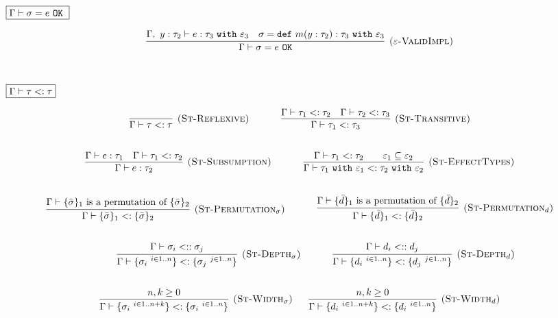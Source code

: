 \documentclass{llncs}
\newcommand{\keywadj}[1]{\mathtt{#1}}
\newcommand{\keyw}[1]{\keywadj{#1}~}
\newcommand{\type}[2]{
	#1~\keyw{with} #2
}
\begin{document}
\noindent
$\fbox{$\Gamma \vdash \sigma = e~\keyw{OK}$}$

\[
\begin{array}{c}
\infer[\textsc{($\varepsilon$-ValidImpl)}]
	{\Gamma \vdash \sigma = e~\keywadj{OK}}
	{\Gamma,~y:\tau_{2} \vdash e: \tau_{3}~\keyw{with} \varepsilon_3 & \sigma = \keyw{def} m(y:\tau_{2}):\tau_{3}~\keyw{with} \varepsilon_3} \\[5ex]
\end{array}
\]



\noindent
$\fbox{$\Gamma \vdash \tau <: \tau$}$

\[
\begin{array}{c}

\infer[\textsc{(St-Reflexive)}]
	{\Gamma \vdash \tau <: \tau}
	{}
	
~~~~~~~~~~

	\infer[\textsc{(St-Transitive)}]
	{\Gamma \vdash \tau_1 <: \tau_3}
	{\Gamma \vdash \tau_1 <: \tau_2 & \Gamma \vdash \tau_2 <: \tau_3}\\[5ex]

\infer[\textsc{(St-Subsumption)}]
	{\Gamma \vdash e : \tau_2}
	{\Gamma \vdash e : \tau_1 & \Gamma \vdash \tau_1 <: \tau_2} 
	
	~~~~~~~~~~
	
\infer[\textsc{(St-EffectTypes)}]
	{ \Gamma \vdash \type{\tau_1}{\varepsilon_1} <: \type{\tau_2}{\varepsilon_2}}
	{ \Gamma \vdash \tau_1 <: \tau_2 ~~~~~~ \varepsilon_1 \subseteq \varepsilon_2} \\[5ex]

\infer[\textsc{(St-Permutation$_\sigma$)}]
	{\Gamma \vdash \{ \bar \sigma \}_1 <: \{ \bar \sigma \}_2 }
	{\Gamma \vdash \{ \bar \sigma \}_1 $ is a permutation of $ \{ \bar \sigma \}_2}
	
	~~~~~~~~~~
	
\infer[\textsc{(St-Permutation$_d$)}]
	{\Gamma \vdash \{ \bar d \}_1 <: \{ \bar d \}_2 }
	{\Gamma \vdash \{ \bar d \}_1 $ is a permutation of $ \{ \bar d \}_2}
	
	\\[5ex]
	
	~~~~~~~~~~

\infer[\textsc{(St-Depth$_\sigma$)}]
	{ \Gamma \vdash \{ \sigma_i~^{i \in 1..n} \} <: \{ \sigma_j~^{j \in 1..n} \} }
	{ \Gamma \vdash \sigma_i <:: \sigma_j }
	
	~~~~~~~~~~
	
\infer[\textsc{(St-Depth$_d$)}]
	{ \Gamma \vdash \{ d_i~^{i \in 1..n} \} <: \{ d_j~^{j \in 1..n} \} }
	{ \Gamma \vdash d_i <:: d_j }
	
	\\[5ex]
	
\infer[\textsc{(St-Width$_\sigma$)}]
	{ \Gamma \vdash \{ \sigma_i~^{i \in 1..n+k} \} <: \{ \sigma_i~^{i \in 1..n} \} }
	{n,k \geq 0}
	
~~~~~
  
\infer[\textsc{(St-Width$_d$)}]
	{ \Gamma \vdash \{ d_i~^{i \in 1..n+k} \} <: \{ d_i~^{i \in 1..n} \} }
	{n,k \geq 0}
	
		\\[5ex]
	
	
\end{array}
\]
\end{document}
